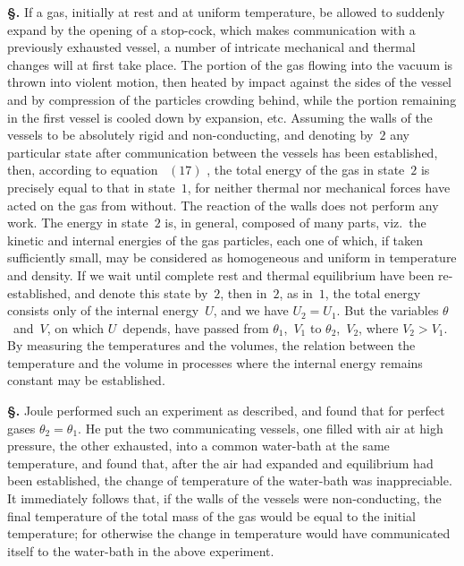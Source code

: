 \documentclass[12pt]{book}[2005/09/16]
\newcommand{\Chg}[2]{#2}
\newcommand{\Section}[1]{
  \medskip\par\textbf{§\;#1}
  \label{section:#1}
}
\newcommand{\Eq}[1]{%
  \hyperref[eqn:#1]{\ensuremath{#1}}%
}
\newcommand{\PageSep}[1]{\ignorespaces}
\begin{document}
\Section{68.} If a gas, initially at rest and at uniform temperature,
be allowed to suddenly expand by the opening of a \Chg{stopcock}{stop-cock},
which makes communication with a previously exhausted
vessel, a number of intricate mechanical and thermal
changes will at first take place. The portion of the gas
flowing into the vacuum is thrown into violent motion, then
heated by impact against the sides of the vessel and by
compression of the particles crowding behind, while the
portion remaining in the first vessel is cooled down by
expansion, etc. Assuming the walls of the vessels to be
absolutely rigid and non-conducting, and denoting by~$2$ any
particular state after communication between the vessels
has been established, then, according to equation~\Eq{(17)}, the
total energy of the gas in state~$2$ is precisely equal to that
%
in state~$1$, for neither thermal nor mechanical forces have
acted on the gas from without. The reaction of the walls
does not perform any work. The energy in state~$2$ is,
in general, composed of many parts, viz.\ the kinetic and
internal energies of the gas particles, each one of which, if
taken sufficiently small, may be considered as homogeneous
and uniform in temperature and density. If we wait until
complete rest and thermal equilibrium have been re-established,
and denote this state by~$2$, then in~$2$, as in~$1$, the total
energy consists only of the internal energy~$U$, and we have
%
$U_{2} = U_{1}$. But the variables $\theta$~and~$V$, on which $U$~depends,
have passed from $\theta_{1}$,~$V_{1}$ to $\theta_{2}$,~$V_{2}$, where $V_{2} > V_{1}$. By
measuring the temperatures and the volumes, the relation
between the temperature and the volume in processes where
the internal energy remains constant may be established.

\Section{69.} Joule performed such an experiment as described,
%
and found that for perfect gases $\theta_{2} = \theta_{1}$. He put the two
communicating vessels, one filled with air at high pressure,
the other exhausted, into a common water-bath at the
same temperature, and found that, after the air had expanded
and equilibrium had been established, the change
of temperature of the water-bath was inappreciable. It
immediately follows that, if the walls of the vessels were
\PageSep{48}
non-conducting, the final temperature of the total mass of
the gas would be equal to the initial temperature; for otherwise
the change in temperature would have communicated
itself to the water-bath in the above experiment.
\end{document}

